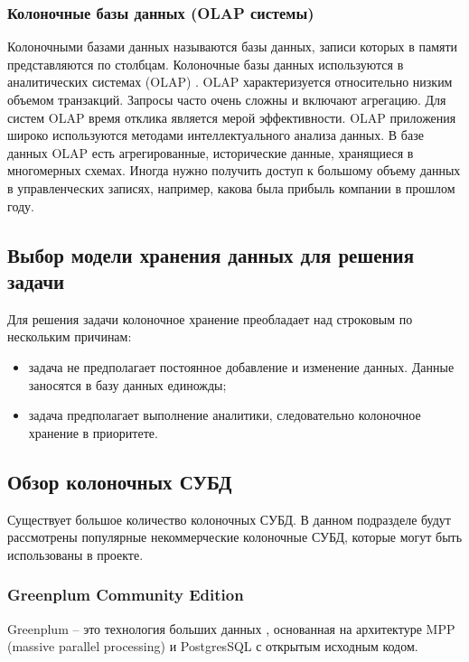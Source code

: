 \subsubsection{Колоночные базы данных (OLAP системы)}

Колоночными базами данных называются базы данных, записи которых в памяти представляются по столбцам. Колоночные базы данных используются в аналитических системах (OLAP) \cite{olap}. OLAP характеризуется относительно низким объемом транзакций. Запросы часто очень сложны и включают агрегацию. Для систем OLAP время отклика является мерой эффективности. OLAP приложения широко используются методами интеллектуального анализа данных. В базе данных OLAP есть агрегированные, исторические данные, хранящиеся в многомерных схемах. Иногда нужно получить доступ к большому объему данных в управленческих записях, например, какова была прибыль компании в прошлом году.

\subsection{Выбор модели хранения данных для решения задачи}

Для решения задачи колоночное хранение преобладает над строковым по нескольким причинам:

\begin{itemize}
	\item задача не предполагает постоянное добавление и изменение данных. Данные заносятся в базу данных единожды;
	\item задача предполагает выполнение аналитики, следовательно колоночное хранение в приоритете.
\end{itemize}

\subsection{Обзор колоночных СУБД}

Существует большое количество колоночных СУБД. В данном подразделе будут рассмотрены популярные некоммерческие колоночные СУБД, которые могут быть использованы в проекте.

\subsubsection{Greenplum Community Edition}

Greenplum \cite{greenplum} -- это технология больших данных , основанная на архитектуре MPP (massive parallel processing) и PostgresSQL \cite{postgres} с открытым исходным кодом.


